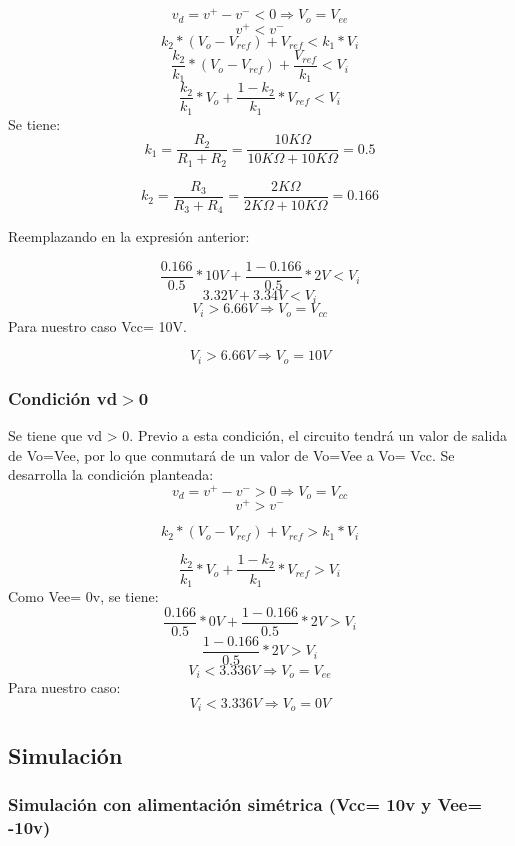 \[v_d = v^+ - v^- < 0 \Rightarrow V_o = V_{ee}\]
\[v^+ < v^- \]
\[k_2 * (V_o - V_{ref}) + V_{ref} < k_1 * V_i\]
\[\frac{k_2}{k_1} * (V_o - V_{ref}) + \frac{V_{ref}}{k_1} < V_i \]
\[\frac{k_2}{k_1} * V_o + \frac{1 - k_2}{k_1} * V_{ref} < V_i \]
Se tiene:
\[ k_1 = \frac{R_2}{R_1 + R_2} = \frac{10K\Omega}{10K\Omega + 10K\Omega} = 0.5\]

\[ k_2 = \frac{R_3}{R_3 + R_4} = \frac{2K\Omega}{2K\Omega + 10K\Omega} = 0.166\]

Reemplazando en la expresión anterior:

\[\frac{0.166}{0.5} * 10V + \frac{1 - 0.166}{0.5} * 2V < V_i \]
\[3.32V + 3.34V < V_i \]
\[V_i > 6.66V \Rightarrow V_o = V_{cc}\]
Para nuestro caso Vcc= 10V.

\[V_i > 6.66V \Rightarrow V_o = 10V\]

\subsubsection{Condición vd$>$0}
Se tiene que vd > 0. Previo a esta condición, el circuito tendrá un valor de salida de Vo=Vee, por lo que conmutará de un valor de Vo=Vee a Vo= Vcc. Se desarrolla la condición planteada:
\[v_d = v^+ - v^- > 0 \Rightarrow V_o = V_{cc}\]
\[v^+ > v^-\]

\[ k_2 * (V_o - V_{ref}) + V_{ref} > k_1 * V_i\]

\[\frac{k_2}{k_1} * V_o + \frac{1 - k_2}{k_1} * V_{ref} > V_i \]
Como Vee= 0v, se tiene:
\[\frac{0.166}{0.5} * 0V + \frac{1 - 0.166}{0.5} * 2V > V_i \]
\[\frac{1 - 0.166}{0.5} * 2V > V_i \]
\[V_i < 3.336V \Rightarrow V_o = V_{ee}\]
Para nuestro caso:
\[V_i < 3.336V \Rightarrow V_o = 0V\]

\subsection{Simulación}

\subsubsection{Simulación con alimentación simétrica (Vcc= 10v y Vee= -10v)}

